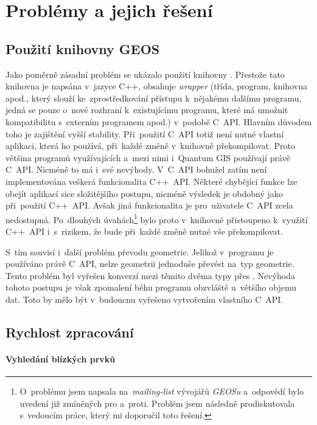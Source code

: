 \chapter{Problémy a jejich řešení}
\label{7-problemy}

\section{Použití knihovny GEOS}
\label{problemy-geos}
Jako poměrně zásadní problém se ukázalo použití knihovny . 
Přestože tato knihovna je napsána v~jazyce C++, obsahuje 
\textit{wrapper} (třída, program, knihovna apod., který slouží 
ke~zprostředkování přístupu k~nějakému dalšímu programu, jedná se pouze 
o~nové rozhraní k~existujícímu programu, které má umožnit kompatibilitu
s~externím programem apod.) v~podobě C~API. Hlavním důvodem toho je 
zajištění vyšší stability. Při~použití C~API totiž není nutné vlastní 
aplikaci, která ho používá, při~každé změně v~knihovně  překompilovat. 
Proto většina programů využívajících  a~mezi nimi i~Quantum 
GIS používají právě C~API. Nicméně to má i~své nevýhody. V~C~API bohužel 
zatím není implementována veškerá funkcionalita C++~API. Některé chybějící 
funkce lze obejít aplikací sice složitějšího postupu, nicméně výsledek je 
obdobný jako při~použití C++~API. Avšak jiná funkcionalita je pro~uživatele 
C~API zcela nedostupná. Po~dlouhých úvahách\footnote{O~problému jsem napsala
na~\textit{mailing-list} vývojářů \textit{GEOSu} a~odpovědí bylo uvedení 
již zmíněných pro a~proti. Problém jsem následně prodiskutovala s~vedoucím 
práce, který mi doporučil toto řešení.} bylo proto v~knihovně  
přistoupeno k~využití C++~API i~s~rizikem, že bude při~každé změně nutné 
vše překompilovat. 

S~tím souvisí i~další problém převodu geometrie. Jelikož v~programu  
je používáno právě C~API, nelze  geometrii jednoduše převést na~typ 
 geometrie. Tento problém byl vyřešen konverzí mezi těmito dvěma
typy přes . Nevýhoda tohoto postupu je však zpomalení běhu programu 
obzvláště u~většího objemu dat. Toto by mělo být v~budoucnu vyřešeno 
vytvořením vlastního C~API.


\section{Rychlost zpracování}
\label{problemy-rychlost}

\subsubsection{Vyhledání blízkých prvků}


